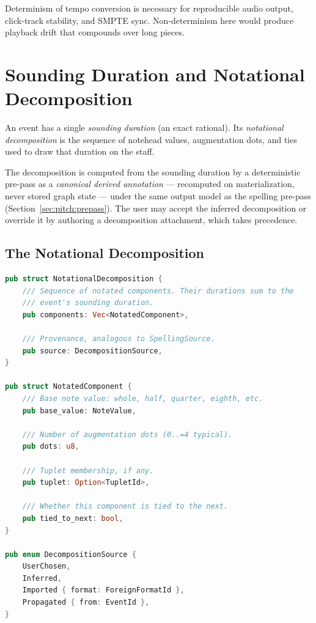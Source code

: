 \documentclass[11pt,letterpaper]{report}
\begin{document}
\begin{rationale}
  Determinism of tempo conversion is necessary for reproducible audio
  output, click-track stability, and SMPTE sync. Non-determinism here
  would produce playback drift that compounds over long pieces.
\end{rationale}

\section{Sounding Duration and Notational Decomposition}
\label{sec:time:notrhythm}

An event has a single \emph{sounding duration} (an exact rational).
Its \emph{notational decomposition} is the sequence of notehead values,
augmentation dots, and ties used to draw that duration on the staff.

The decomposition is computed from the sounding duration by a
deterministic pre-pass as a \emph{canonical derived annotation} ---
recomputed on materialization, never stored graph state --- under the
same output model as the spelling pre-pass
(Section~\ref{sec:pitch:prepass}). The user may accept the inferred
decomposition or override it by authoring a decomposition attachment,
which takes precedence.

\subsection{The Notational Decomposition}

\begin{lstlisting}[language=Rust]
pub struct NotationalDecomposition {
    /// Sequence of notated components. Their durations sum to the
    /// event's sounding duration.
    pub components: Vec<NotatedComponent>,

    /// Provenance, analogous to SpellingSource.
    pub source: DecompositionSource,
}

pub struct NotatedComponent {
    /// Base note value: whole, half, quarter, eighth, etc.
    pub base_value: NoteValue,

    /// Number of augmentation dots (0..=4 typical).
    pub dots: u8,

    /// Tuplet membership, if any.
    pub tuplet: Option<TupletId>,

    /// Whether this component is tied to the next.
    pub tied_to_next: bool,
}

pub enum DecompositionSource {
    UserChosen,
    Inferred,
    Imported { format: ForeignFormatId },
    Propagated { from: EventId },
}
\end{lstlisting}
\end{document}
